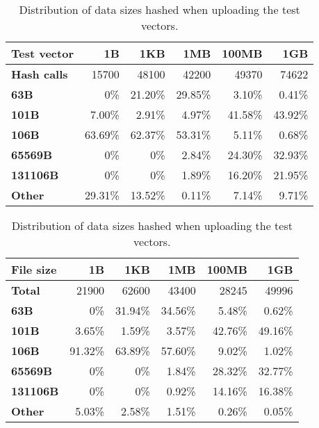 \begin{table}
  \centering
  \caption{Distribution of data sizes hashed when uploading the test vectors.}
  \begin{tabular}{ | l | r | r | r | r | r | }
    \hline
    \textbf{Test vector}  &   1B       &  1KB      &  1MB      &  100MB    &  1GB      \\ \hline
    \textbf{Hash calls}   &   15700    &  48100    &  42200    &  49370    &  74622    \\ \hline
    \textbf{63B}          &   0\%      &  21.20\%  &  29.85\%  &  3.10\%   &  0.41\%   \\ \hline
    \textbf{101B}         &   7.00\%   &  2.91\%   &  4.97\%   &  41.58\%  &  43.92\%  \\ \hline
    \textbf{106B}         &   63.69\%  &  62.37\%  &  53.31\%  &  5.11\%   &  0.68\%   \\ \hline
    \textbf{65569B}       &   0\%      &  0\%      &  2.84\%   &  24.30\%  &  32.93\%  \\ \hline
    \textbf{131106B}      &   0\%      &  0\%      &  1.89\%   &  16.20\%  &  21.95\%  \\ \hline
    \textbf{Other}        &   29.31\%  &  13.52\%  &  0.11\%   &  7.14\%   &  9.71\%   \\ \hline
  \end{tabular}
  \label{tbl:tahoe:datauploaded}
\end{table}


\begin{table}
  \centering
  \caption{Distribution of data sizes hashed when uploading the test vectors.}
  \begin{tabular}{ | l | r | r | r | r | r | }
    \hline
    \textbf{File size} &  1B       &  1KB      &  1MB      &  100MB    &  1GB      \\  \hline
    \textbf{Total}     &  21900    &  62600    &  43400    &  28245    &  49996    \\  \hline
    \textbf{63B}       &  0\%      &  31.94\%  &  34.56\%  &  5.48\%   &  0.62\%   \\  \hline
    \textbf{101B}      &  3.65\%   &  1.59\%   &  3.57\%   &  42.76\%  &  49.16\%  \\  \hline
    \textbf{106B}      &  91.32\%  &  63.89\%  &  57.60\%  &  9.02\%   &  1.02\%   \\  \hline
    \textbf{65569B}    &  0\%      &  0\%      &  1.84\%   &  28.32\%  &  32.77\%  \\  \hline
    \textbf{131106B}   &  0\%      &  0\%      &  0.92\%   &  14.16\%  &  16.38\%  \\  \hline
    \textbf{Other}     &  5.03\%   &  2.58\%   &  1.51\%   &  0.26\%   &  0.05\%   \\  \hline
  \end{tabular}
  \label{tbl:tahoe:datadownloaded}
\end{table}
